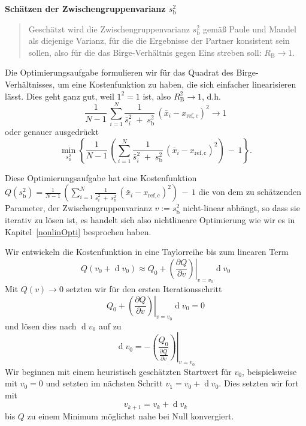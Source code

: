 \textbf{Schätzen der Zwischengruppenvarianz $s^2_\mathrm{b}$}
\begin{quote}
Geschätzt wird die Zwischengruppenvarianz $s^2_\mathrm{b}$ gemäß Paule und Mandel \cite{Pau82} als
diejenige Varianz, für die die Ergebnisse der Partner konsistent sein sollen, also für die
das Birge-Verhältnis gegen Eins streben soll: $R_\mathrm{B} \rightarrow 1$.
\end{quote}
Die Optimierungsaufgabe formulieren wir für das Quadrat des Birge-Verhältnisses,
um eine Kostenfunktion zu haben, die sich einfacher linearisieren lässt. Dies
geht ganz gut, weil $1^2 = 1$ ist, also $R^2_\mathrm{B} \rightarrow 1$, d.h.
\begin{equation*}
\frac{1}{N-1} \, \sum\limits_{i=1}^N
\frac{1}{\bar s^2_i \; + \; s^2_\mathrm{b}} \, \left(\bar x_i - x_\mathrm{ref, c}\right)^2 \rightarrow 1
\end{equation*}
oder genauer ausgedrückt
\begin{equation}
\min_{s^2_\mathrm{b}} \left\{\frac{1}{N-1} \, \left( \sum\limits_{i=1}^N
\frac{1}{\bar s^2_i \; + \; s^2_\mathrm{b}} \, \left(\bar x_i - x_\mathrm{ref, c}\right)^2  \right) \, - \, 1\right\}.
\label{eq:x_bet_Bedingung}
\end{equation}

Diese Optimierungsaufgabe hat eine Kostenfunktion 
$Q(s^2_\mathrm{b}) = \frac{1}{N-1} \, \left( \sum\limits_{i=1}^N 
\frac{1}{\bar s^2_i \; + \; s^2_\mathrm{b}} \, \left(\bar x_i - x_\mathrm{ref, c}\right)^2  \right) \, - \, 1$
die von dem zu schätzenden Parameter, der Zwischengruppenvarianz
$v := s^2_\mathrm{b}$ nicht-linear abhängt, so dass sie iterativ zu lösen ist, es handelt sich also
nichtlineare Optimierung wie wir es in Kapitel~\ref{nonlinOpti} besprochen haben.

Wir entwickeln die Kostenfunktion in 
eine Taylorreihe bis zum linearen Term
\begin{equation}
Q(v_0 + \operatorname{d} v_0) \approx 
Q_0 + \left.\left( \frac{\partial Q}{\partial v}\right)
\right|_{v=v_0} \operatorname{d} v_0 
\end{equation}
Mit $Q(v) \rightarrow 0$ setzten wir für den ersten
Iterationsschritt
\begin{equation}
Q_0 + \left.\left( \frac{\partial Q}{\partial v}\right)
\right|_{v=v_0} \operatorname{d} v_0 = 0
\end{equation}
und lösen dies nach $\operatorname{d} v_0$ auf zu
\begin{equation}
\operatorname{d} v_0 = -\left. \left( \frac{Q_0}{\frac{\partial Q}{\partial v}}\right) \right| _{v=v_0} 
\end{equation}
Wir beginnen mit einem heuristisch geschätzten Startwert für $v_0$, beispielsweise mit $v_0 = 0$
und setzten im nächsten Schritt $v_1 = v_0 + \operatorname{d} v_0$.
Dies setzten wir fort mit
\begin{equation}
v_{k+1} =v_k + \operatorname{d} v_k
\end{equation}
bis $Q$ zu einem Minimum möglichst nahe bei Null konvergiert.

